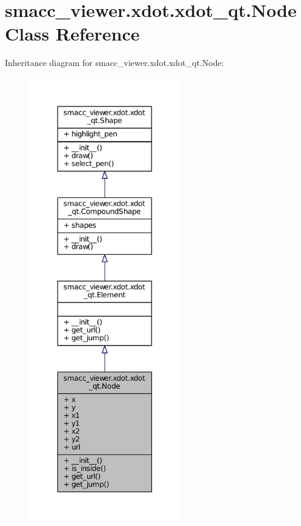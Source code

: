 \hypertarget{classsmacc__viewer_1_1xdot_1_1xdot__qt_1_1Node}{}\section{smacc\+\_\+viewer.\+xdot.\+xdot\+\_\+qt.\+Node Class Reference}
\label{classsmacc__viewer_1_1xdot_1_1xdot__qt_1_1Node}


Inheritance diagram for smacc\+\_\+viewer.\+xdot.\+xdot\+\_\+qt.\+Node\+:
\nopagebreak
\begin{figure}[H]
\begin{center}
\leavevmode
\includegraphics[height=550pt]{classsmacc__viewer_1_1xdot_1_1xdot__qt_1_1Node__inherit__graph}
\end{center}
\end{figure}


